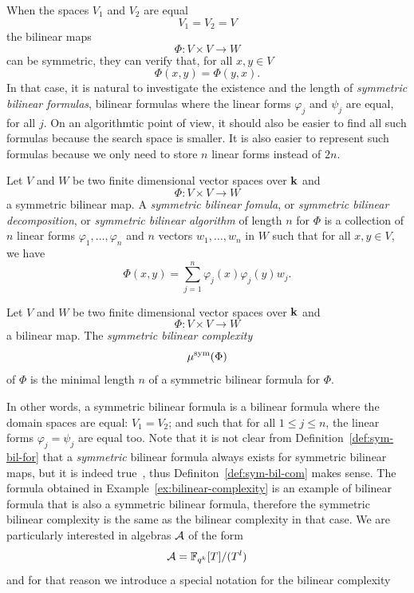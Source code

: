 When the spaces $V_1$ and $V_2$ are equal
\[
  V_1 = V_2 = V
\]
the bilinear maps 
\[
  \Phi:V\times V\to W
\]
can be symmetric, \ie they can verify that, for all $x, y\in V$
\[
  \Phi(x, y) = \Phi(y, x).
\]
In that case, it is natural to investigate the existence and the length of
\emph{symmetric bilinear formulas}, \ie bilinear formulas where the linear forms
$\varphi_j$ and $\psi_j$ are equal, for all $j$. On an algorithmtic point of
view, it should also be easier to find all such formulas because the
search space is smaller. It is also easier to represent such formulas because we
only need to store $n$ linear forms instead of $2n$.
\begin{defi}
  \label{def:sym-bil-for}
  Let $V$ and $W$ be two finite dimensional vector spaces over $\mathbf{k}$ and 
  \[
    \Phi:V\times V\to W
  \]
  a symmetric bilinear map. A \emph{symmetric bilinear fomula}, or
  \emph{symmetric bilinear decomposition}, or
  \emph{symmetric bilinear algorithm} of length $n$ for $\Phi$ is a
  collection of $n$ linear forms $\varphi_1, \dots, \varphi_n$
  and $n$ vectors $w_1, \dots, w_n$ in $W$ such that for all
  $x, y\in V$, we have
  \[
    \Phi(x, y) = \sum_{j=1}^n \varphi_j(x)\varphi_j(y)w_j.
  \]
\end{defi}
\begin{defi}
  \label{def:sym-bil-com}
  Let $V$ and $W$ be two finite dimensional vector spaces over $\mathbf{k}$ and 
  \[
    \Phi:V\times V\to W
  \]
  a bilinear map. The \emph{symmetric bilinear complexity} 
  \[
    \mu^{\textrm{sym}}(\Phi)
  \]
  of $\Phi$ is the minimal length $n$ of a symmetric bilinear formula for
  $\Phi$.
\end{defi}
In other words, a symmetric bilinear formula is a bilinear formula where the
domain spaces are equal: $V_1=V_2$; and such that for all $1\leq j\leq n$,
the linear forms $\varphi_j=\psi_j$ are equal too. Note that it is not
clear from Definition~\ref{def:sym-bil-for} that a
\emph{symmetric} bilinear formula always
exists for symmetric bilinear maps, but it is indeed
true~\cite[Lemma $1.6$]{Randriam12}, thus
Definiton~\ref{def:sym-bil-com} makes sense. The formula obtained in
Example~\ref{ex:bilinear-complexity} is an example of bilinear formula that is
also a symmetric bilinear formula, therefore the symmetric bilinear complexity
is the same as the bilinear complexity in that case. We are particularly
interested in algebras $\mathcal{A}$ of the form
\[
  \mathcal{A} = \mathbb{F}_{q^k}[T]/(T^l)
\]
and for that reason we introduce a special notation for the bilinear complexity

